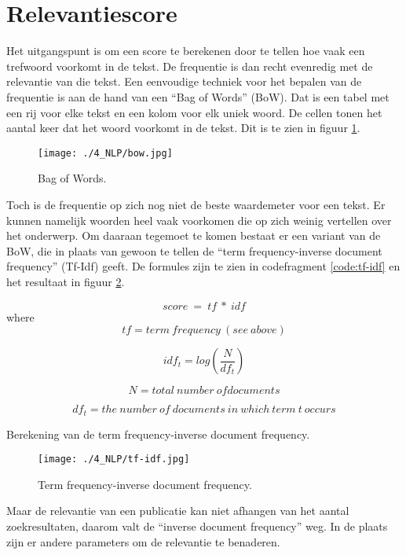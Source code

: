 \section{Relevantiescore}
Het uitgangspunt is om een score te berekenen door te tellen hoe vaak een trefwoord voorkomt in de tekst. De frequentie is dan recht evenredig met de relevantie van die tekst. Een eenvoudige techniek voor het bepalen van de frequentie is aan de hand van een ``Bag of Words'' (BoW). Dat is een tabel met een rij voor elke tekst en een kolom voor elk uniek woord. De cellen tonen het aantal keer dat het woord voorkomt in de tekst.  Dit is te zien in figuur \ref{fig:bow}.
\begin{figure}[h!]
    \centering
    \texttt{[image: ./4\_NLP/bow.jpg]}
    \caption[Bag of Words.]{\label{fig:bow}Bag of Words.}
\end{figure}
Toch is de frequentie op zich nog niet de beste waardemeter voor een tekst. Er kunnen namelijk woorden heel vaak voorkomen die op zich weinig vertellen over het onderwerp. Om daaraan tegemoet te komen bestaat er een variant van de BoW, die in plaats van gewoon te tellen de ``term frequency-inverse document frequency'' (Tf-Idf) geeft. De formules zijn te zien in codefragment \ref{code:tf-idf} en het resultaat in figuur \ref{fig:tf-idf}.
\begin{listing}[h!]
    \[
        score\ =\ tf\ \ast\ idf
    \]  
    where
    \[
        tf=term\ frequency\ \left(see\ above\right)
    \] 
    
    \[
        idf_t=log\left(\frac{N}{df_t}\right)
    \]  
    
    \[ 
        N=total\ number\ ofdocuments
    \]  
    
    \[ 
        df_t=the\ number\ of\ documents\ in\ which\ term\ t\ occurs
    \] 
     
    \caption[term frequency-inverse document frequency]{Berekening van de term frequency-inverse document frequency.}
    \label{code:tf-idf}
\end{listing}
\begin{figure}[h!]
    \centering
    \texttt{[image: ./4\_NLP/tf-idf.jpg]}
    \caption[term frequency-inverse document frequency.]{\label{fig:tf-idf}Term frequency-inverse document frequency.}
\end{figure}
Maar de relevantie van een publicatie kan niet afhangen van het aantal zoekresultaten, daarom valt de ``inverse document frequency'' weg. In de plaats zijn er andere parameters om de relevantie te benaderen.
